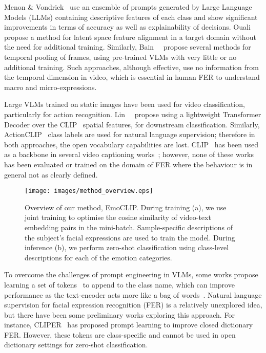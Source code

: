 \documentclass[10pt,twocolumn,letterpaper]{article}
\begin{document}
Menon \& Vondrick~\cite{menon2022visual} use an ensemble of prompts generated by Large Language Models (LLMs) containing descriptive features of each class and show significant improvements in terms of accuracy as well as explainability of decisions. Ouali~\etal~\cite{ouali_black_2023} propose a method for latent space feature alignment in a target domain without the need for additional training. Similarly, Bain~\etal~\cite{bain_clip-hitchhikers_2022} propose several methods for temporal pooling of frames, using pre-trained VLMs with very little or no additional training.
Such approaches, although effective, use no information from the temporal dimension in video, which is essential in human FER to understand macro and micro-expressions. 

Large VLMs trained on static images have been used for video classification, particularly for action recognition. Lin~\etal~\cite{lin_frozen_2022} propose using a lightweight Transformer Decoder over the CLIP~\cite{radford_CLIP_2021} spatial features, for downstream classification. Similarly, ActionCLIP~\cite{wang_actionclip_2021} class labels are used for natural language supervision; therefore in both approaches, the open vocabulary capabilities are lost. CLIP~\cite{radford_CLIP_2021} has been used as a backbone in several video captioning works~\cite{luo_clip4clip_2022, xue_clip-vip_2022, ma_x-clip_2022}; however, none of these works has been evaluated or trained on the domain of FER where the behaviour is in general not as clearly defined.

\begin{figure*}[t!]
    \centering
    \texttt{[image: images/method\_overview.eps]}
    \caption{Overview of our method, EmoCLIP. During training (a), we use joint training to optimise the cosine similarity of video-text embedding pairs in the mini-batch. Sample-specific descriptions of the subject's facial expressions are used to train the model. During inference (b), we perform zero-shot classification using class-level descriptions for each of the emotion categories.}
    \label{fig:overview}
\end{figure*}

To overcome the challenges of prompt engineering in VLMs, some works propose learning a set of tokens~\cite{zhou_learning_2022, zhou_conditional_2022, parisot_learning_2023} to append to the class name, which can improve performance as the text-encoder acts more like a bag of words~\cite{yuksekgonul_when_2023, bagad_test_2023}.  Natural language supervision for facial expression recognition (FER) is a relatively unexplored idea, but there have been some preliminary works exploring this approach. For instance, CLIPER~\cite{li_cliper_2023} has proposed prompt learning to improve closed dictionary FER. However, these tokens are class-specific and cannot be used in open dictionary settings for zero-shot classification.
\end{document}
